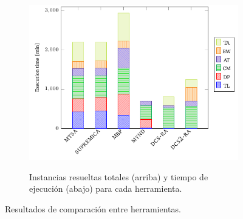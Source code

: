 \begin{figure}[th]
\begin{subfigure}{0.5\textwidth}
        \includegraphics[width=\linewidth]{figures/benchmark/tools_time.pdf}\label{fig:tools:results:time}
        \caption{Instancias resueltas totales (arriba) y tiempo de ejecución (abajo) para cada herramienta.}
    \end{subfigure}
\caption{Resultados de comparación entre herramientas.}
\label{fig:tools:results}
\end{figure}
